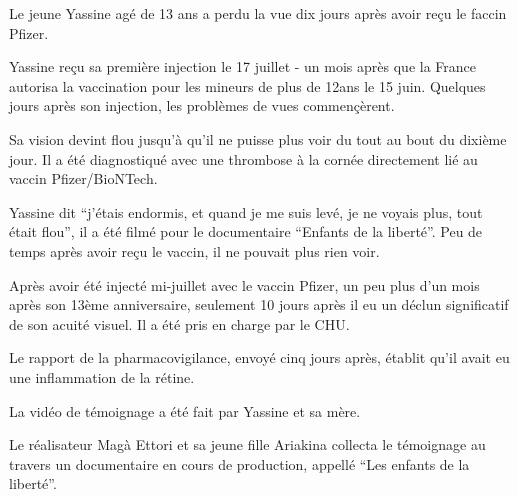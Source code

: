 Le jeune Yassine agé de 13 ans a perdu la vue dix jours après avoir reçu le
faccin Pfizer.

Yassine reçu sa première injection le 17 juillet - un mois après que la France
autorisa la vaccination pour les mineurs de plus de 12ans le 15 juin. Quelques
jours après son injection, les problèmes de vues commençèrent.

Sa vision devint flou jusqu'à qu'il ne puisse plus voir du tout au bout du
dixième jour. Il a été diagnostiqué avec une thrombose à la cornée directement
lié au vaccin Pfizer/BioNTech.

Yassine dit “j'étais endormis, et quand je me suis levé, je ne voyais plus, tout
était flou”, il a été filmé pour le documentaire “Enfants de la liberté”. Peu de
temps après avoir reçu le vaccin, il ne pouvait plus rien voir.

Après avoir été injecté mi-juillet avec le vaccin Pfizer, un peu plus d'un mois
après son 13ème anniversaire, seulement 10 jours après il eu un déclun
significatif de son acuité visuel. Il a été pris en charge par le CHU.

Le rapport de la pharmacovigilance, envoyé cinq jours après, établit qu'il avait
eu une inflammation de la rétine.

La vidéo de témoignage a été fait par Yassine et sa mère.

Le réalisateur Magà Ettori et sa jeune fille Ariakina collecta le témoignage au
travers un documentaire en cours de production, appellé “Les enfants de la
liberté”.

